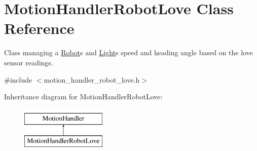 \hypertarget{class_motion_handler_robot_love}{}\section{Motion\+Handler\+Robot\+Love Class Reference}
\label{class_motion_handler_robot_love}


Class managing a \hyperlink{class_robot}{Robot}\textquotesingle{}s and \hyperlink{class_light}{Light}\textquotesingle{}s speed and heading angle based on the love sensor readings.  




{\ttfamily \#include $<$motion\+\_\+handler\+\_\+robot\+\_\+love.\+h$>$}

Inheritance diagram for Motion\+Handler\+Robot\+Love\+:\begin{figure}[H]
\begin{center}
\leavevmode
\includegraphics[height=2.000000cm]{class_motion_handler_robot_love}
\end{center}
\end{figure}

